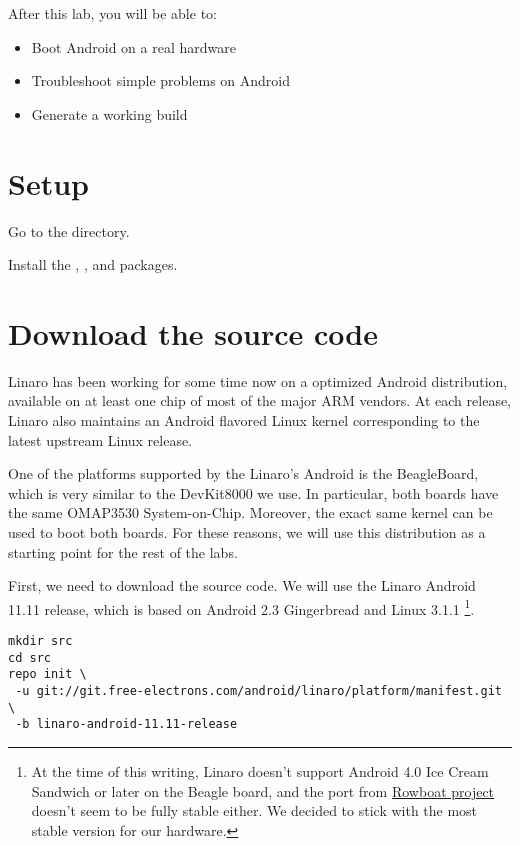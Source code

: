 
After this lab, you will be able to:
\begin{itemize}
  \item Boot Android on a real hardware
  \item Troubleshoot simple problems on Android
  \item Generate a working build
\end{itemize}

\section{Setup}

Go to the  directory.

Install the , , 
and  packages.

\section{Download the source code}

Linaro has been working for some time now on a optimized Android
distribution, available on at least one chip of most of the major ARM
vendors. At each release, Linaro also maintains an Android flavored
Linux kernel corresponding to the latest upstream Linux release.

One of the platforms supported by the Linaro's Android is the
BeagleBoard, which is very similar to the DevKit8000 we use. In
particular, both boards have the same OMAP3530 System-on-Chip.
Moreover, the exact same kernel can be used to boot both boards.
For these reasons, we will use this distribution as a
starting point for the rest of the labs.

First, we need to download the source code. We will use the Linaro
Android 11.11 release, which is based on Android 2.3 Gingerbread and
Linux 3.1.1
\footnote{At the time of this writing, Linaro doesn't support Android
  4.0 Ice Cream Sandwich or later on the Beagle board, and the port
  from \href{http://code.google.com/p/rowboat} {Rowboat project}
  doesn't seem to be fully stable either. We decided to stick with the
  most stable version for our hardware.}.

\begin{verbatim}
mkdir src
cd src
repo init \
 -u git://git.free-electrons.com/android/linaro/platform/manifest.git \
 -b linaro-android-11.11-release
\end{verbatim}

